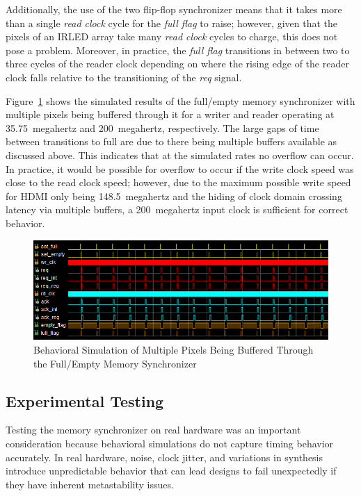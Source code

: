         Additionally, the use of the two flip-flop synchronizer means that it takes more than a single {\it read clock} cycle for the {\it full flag} to raise; however, given that the pixels of an IRLED array take many {\it read clock} cycles to charge, this does not pose a problem. Moreover, in practice, the {\it full flag} transitions in between two to three cycles of the reader clock depending on where the rising edge of the reader clock falls relative to the transitioning of the {\it req} signal.

        Figure~\ref{fig:full_empty_row_sim} shows the simulated results of the full/empty memory synchronizer with multiple pixels being buffered through it for a writer and reader operating at \mbox{35.75 megahertz} and \mbox{200 megahertz}, respectively. The large gaps of time between transitions to full are due to there being multiple buffers available as discussed above. This indicates that at the simulated rates no overflow can occur. In practice, it would be possible for overflow to occur if the write clock speed was close to the read clock speed; however, due to the maximum possible write speed for HDMI only being \mbox{148.5 megahertz} and the hiding of clock domain crossing latency via multiple buffers, a \mbox{200 megahertz} input clock is sufficient for correct behavior.

        \begin{figure}[t]
            \centering
            \includegraphics[width=1.0\textwidth]{fig/full_empty_row_sim.png}
            \caption{Behavioral Simulation of Multiple Pixels Being Buffered Through the Full/Empty Memory Synchronizer}
            \label{fig:full_empty_row_sim}
        \end{figure}

    \subsection{Experimental Testing}
        \label{sec:experimental_testing}
        Testing the memory synchronizer on real hardware was an important consideration because behavioral simulations do not capture timing behavior accurately. In real hardware, noise, clock jitter, and variations in synthesis introduce unpredictable behavior that can lead designs to fail unexpectedly if they have inherent metastability issues.

